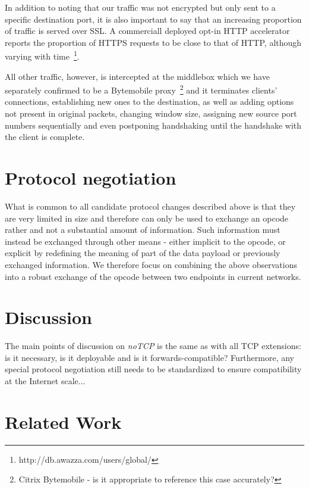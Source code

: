 \documentclass{sig-alternate-10pt}
\begin{document}
In addition to noting that our traffic was not encrypted but only sent to a specific destination port, it is also important to say that an increasing proportion of traffic is served over SSL. A commerciall deployed opt-in HTTP accelerator reports the proportion of HTTPS requests to be close to that of HTTP, although varying with time~\footnote{http://db.awazza.com/users/global/}. 

All other traffic, however, is intercepted at the middlebox which we have separately confirmed to be a Bytemobile proxy~\footnote{Citrix Bytemobile - is it appropriate to reference this case accurately?} and it terminates clients' connections, establishing new ones to the destination, as well as adding options not present in original packets, changing window size, assigning new source port numbers sequentially and even postponing handshaking until the handshake with the client is complete.

\section{Protocol negotiation}

What is common to all candidate protocol changes described above is that they are very limited in size and therefore can only be used to exchange an opcode rather and not a substantial amount of information. Such information must instead be exchanged through other means - either implicit to the opcode, or explicit by redefining the meaning of part of the data payload or previously exchanged information. We therefore focus on combining the above observations into a robust exchange of the opcode between two endpoints in current networks.

\section{Discussion}

The main points of discussion on \emph{noTCP} is the same as with all TCP extensions: is it necessary, is it deployable and is it forwards-compatible? Furthermore, any special protocol negotiation still needs to be standardized to ensure compatibility at the Internet scale...



\section{Related Work}
\label{sec:related}
\end{document}
